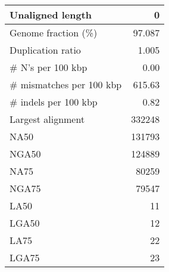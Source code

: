 \documentclass[12pt,a4paper]{article}
\begin{document}
\begin{table}[ht]
\begin{center}
\begin{tabular}{|l*{1}{|r}|}
Unaligned length & 0 \\ \hline
Genome fraction (\%) & 97.087 \\ \hline
Duplication ratio & 1.005 \\ \hline
\# N's per 100 kbp & 0.00 \\ \hline
\# mismatches per 100 kbp & 615.63 \\ \hline
\# indels per 100 kbp & 0.82 \\ \hline
Largest alignment & 332248 \\ \hline
NA50 & 131793 \\ \hline
NGA50 & 124889 \\ \hline
NA75 & 80259 \\ \hline
NGA75 & 79547 \\ \hline
LA50 & 11 \\ \hline
LGA50 & 12 \\ \hline
LA75 & 22 \\ \hline
LGA75 & 23 \\ \hline
\end{tabular}
\end{center}
\end{table}
\end{document}
